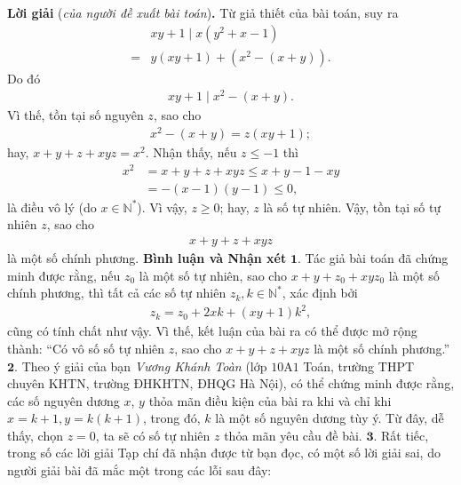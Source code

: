 \begin{multicols}{2}
	\vskip 0.05cm
	\textbf{\color{thachthuctoanhoc}Lời giải} (\textit{của người đề xuất bài toán})\textbf{\color{thachthuctoanhoc}.}
	\vskip 0.05cm
	Từ giả thiết của bài toán, suy ra
	\begin{align*}
		&{xy + 1} \mid x\left( {{y^2} + x - 1} \right) \\
		= &y\left( {xy + 1} \right) + \left( {{x^2} - \left( {x + y} \right)} \right).
	\end{align*}
	Do đó
	\begin{align*}
		{xy + 1} \mid {x^2} - \left( {x + y} \right).
	\end{align*}
	Vì thế, tồn tại số nguyên $z$, sao cho
	\begin{align*}
		{x^2} - \left( {x + y} \right) = z\left( {xy + 1} \right);
	\end{align*}
	hay, $x + y + z + xyz = {x^2}.$
	\vskip 0.05cm  
	Nhận thấy, nếu $z \le -1$  thì
	\begin{align*}
		{x^2} &= x + y + z + xyz \le x + y - 1 - xy \\
		&= - \left( {x - 1} \right)\left( {y - 1} \right) \le 0,
	\end{align*}
	là điều vô lý (do  $x \in \mathbb{N^*}$).
	\vskip 0.05cm
	Vì vậy, $z \ge 0$; hay, $z$ là số tự nhiên.
	\vskip 0.05cm
	Vậy, tồn tại số tự nhiên $z$, sao cho 
	\begin{align*}
		x + y + z + xyz
	\end{align*} là một số chính phương.
	\vskip 0.05cm
	\textbf{\color{thachthuctoanhoc}Bình luận và Nhận xét}
	\vskip 0.05cm
	$\pmb{1.}$ Tác giả bài toán đã chứng minh được rằng, nếu $z_0$  là một số tự nhiên, sao cho $x + y + z_0 + xyz_0$  là một số chính phương, thì tất cả các số tự nhiên $z_k, k \in \mathbb{N^*}$, xác định bởi
	\begin{align*}
		{z_k} = {z_0} + 2xk + \left( {xy + 1} \right){k^2},
	\end{align*}
	cũng có tính chất như vậy. Vì thế, kết luận của bài ra có thể được mở rộng thành: “Có vô số số tự nhiên $z$, sao cho $x + y + z + xyz$ là một số chính phương.”
	\vskip 0.05cm
	$\pmb{2.}$ Theo ý giải của bạn \textit{Vương Khánh Toàn} (lớp $10$A$1$ Toán, trường THPT chuyên KHTN, trường ĐHKHTN, ĐHQG Hà Nội), có thể chứng minh được rằng, các số nguyên dương $x$, $y$ thỏa mãn điều kiện của bài ra khi và chỉ khi $x = k + 1, y = k(k + 1)$, trong đó, $k$ là một số nguyên dương tùy ý. Từ đây, dễ thấy, chọn $z = 0$, ta sẽ có số tự nhiên $z$ thỏa mãn yêu cầu đề bài.
	\vskip 0.05cm
	$\pmb{3.}$ Rất tiếc, trong số các lời giải Tạp chí đã nhận được từ bạn đọc, có một số lời giải sai, do người giải bài đã mắc một trong các lỗi sau đây:

\end{multicols}
